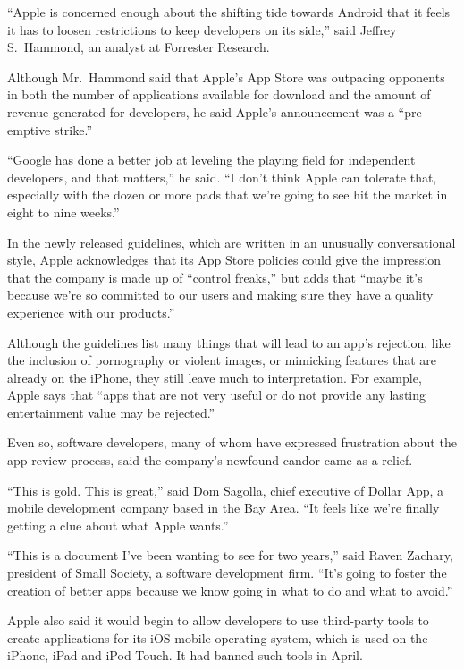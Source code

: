 ﻿\documentclass[12pt]{article}
\begin{document}
``Apple is concerned enough about the shifting tide towards Android that it feels it has to loosen
restrictions to keep developers on its side,'' said Jeffrey S.~Hammond, an analyst at Forrester
Research.

Although Mr.~Hammond said that Apple's App Store was outpacing opponents in both the number of
applications available for download and the amount of revenue generated for developers, he said
Apple's announcement was a ``pre-emptive strike.''

``Google has done a better job at leveling the playing field for independent developers, and that
matters,'' he said. ``I don't think Apple can tolerate that, especially with the dozen or more pads
that we're going to see hit the market in eight to nine weeks.''

In the newly released guidelines, which are written in an unusually conversational style, Apple
acknowledges that its App Store policies could give the impression that the company is made up of
``control freaks,'' but adds that ``maybe it's because we're so committed to our users and making
sure they have a quality experience with our products.''

Although the guidelines list many things that will lead to an app's rejection, like the inclusion of
pornography or violent images, or mimicking features that are already on the iPhone, they still
leave much to interpretation. For example, Apple says that ``apps that are not very useful or do not
provide any lasting entertainment value may be rejected.''

Even so, software developers, many of whom have expressed frustration about the app review process,
said the company's newfound candor came as a relief.

``This is gold. This is great,'' said Dom Sagolla, chief executive of Dollar App, a mobile
development company based in the Bay Area. ``It feels like we're finally getting a clue about what
Apple wants.''

``This is a document I've been wanting to see for two years,'' said Raven Zachary, president of
Small Society, a software development firm. ``It's going to foster the creation of better apps
because we know going in what to do and what to avoid.''

Apple also said it would begin to allow developers to use third-party tools to create applications
for its iOS mobile operating system, which is used on the iPhone, iPad and iPod Touch. It had banned
such tools in April.
\end{document}
